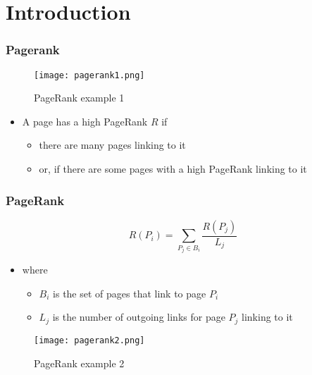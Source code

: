 \section{Introduction}

\begin{frame}
\frametitle{Pagerank}
\begin{figure}
	\centering
	\texttt{[image: pagerank1.png]}
	\caption{PageRank example 1 \cite{prsigner}}
\end{figure}
\begin{itemize}
  \item A page has a high PageRank $R$ if
  \begin{itemize}
    \item there are many pages linking to it
    \item or, if there are some pages with a high PageRank
linking to it
  \end{itemize}
\end{itemize}
\end{frame}

\begin{frame}
\frametitle{PageRank}

\begin{minipage}[l]{0.5\textwidth}
\textbf{$$ 
R(P_i)= \sum_{P_j \in B_i}\frac{R(P_j)}{L_j}
$$}
\begin{itemize}
  \item where
  \begin{itemize}
    \item $B_i$ is the set of pages that link to page $P_i$
    \item $L_j$ is the number of outgoing links for page $P_j$
linking to it
  \end{itemize}
\end{itemize}
\end{minipage}
\begin{minipage}[l]{0.49\textwidth}
\begin{figure}
	\centering
	\texttt{[image: pagerank2.png]}
	\caption{PageRank example 2 \cite{prsigner}}
\end{figure}
\end{minipage}

\end{frame}

